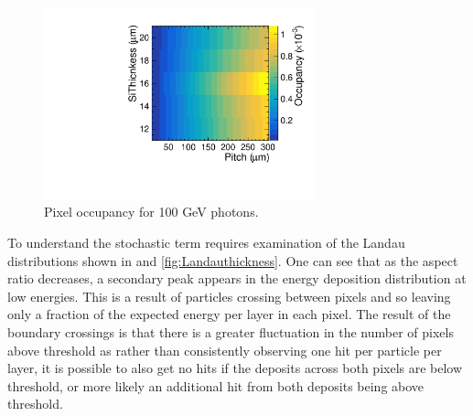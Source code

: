 \begin{figure}
  \centering
  \includegraphics[width=0.7\textwidth,keepaspectratio]{DECALStudies/fig/Occupancy_100GeV.pdf}
  \caption{Pixel occupancy for 100 GeV photons.}
  \label{fig:occupancy}
\end{figure}


To understand the stochastic term requires examination of the Landau distributions shown in  and \ref{fig:Landauthickness}. One can see that as the aspect ratio decreases, a secondary peak appears in the energy deposition distribution at low energies. This is a result of particles crossing between pixels and so leaving only a fraction of the expected energy per layer in each pixel. The result of the boundary crossings is that there is a greater fluctuation in the number of pixels above threshold as rather than consistently observing one hit per particle per layer, it is possible to also get no hits if the deposits across both pixels are below threshold, or more likely an additional hit from both deposits being above threshold. 

